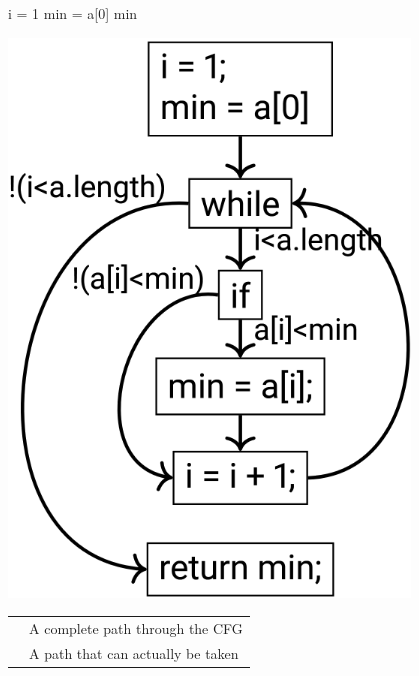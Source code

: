 \documentclass[
    ../../Software_Engineering_Summary.tex,
]
{subfiles}
\begin{document}
\begin{codebox}
    \begin{minipage}
        [c]{0.28\textwidth}
        \begin{algorithm}[H]
            i = 1\;
            min = a[0]\;
            \KwRet min\;
        \end{algorithm}
    \end{minipage}
    \begin{minipage}
        [c]{0.3\textwidth}
        \centering
        \includegraphics[width=0.8\textwidth]{Pics/10/CFGStructural.png}
    \end{minipage}
    \hfill
    \begin{minipage}
        [c]{0.4\textwidth}
        \begin{defbox}
            [Definitions]
            \begin{tabularx}
                {\textwidth}{p{} X}
                {Execution Path} & A complete path through the CFG\\
                {Feasible} & A path that can actually be taken\\
            \end{tabularx}
        \end{defbox}
    \end{minipage}
\end{codebox}
\end{document}
